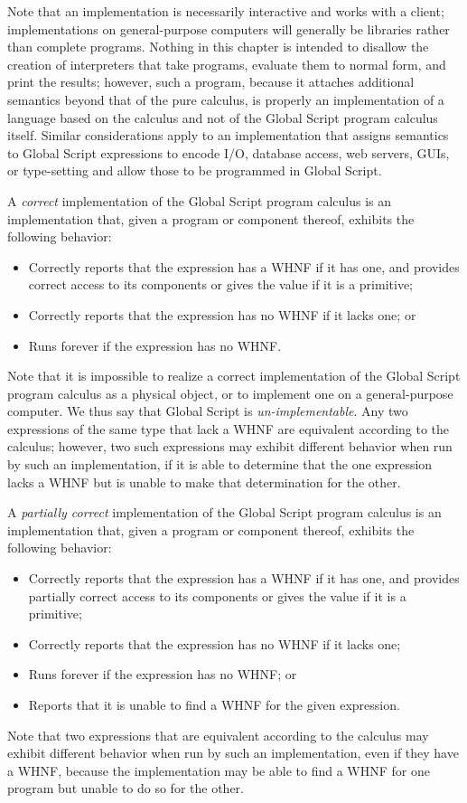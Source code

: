 \documentclass{report}
\newcommand\defn[1]{\emph{#1}}
\begin{document}
Note that an implementation is necessarily interactive and works with a client;
implementations on general-purpose computers will generally be libraries rather than complete programs.
Nothing in this chapter is intended to disallow the creation of interpreters that take programs, evaluate them to normal form, and print the results;
however, such a program, because it attaches additional semantics beyond that of the pure calculus,
is properly an implementation of a language based on the calculus and not of the Global Script program calculus itself.
Similar considerations apply to an implementation that assigns semantics to Global Script expressions to encode
I/O, database access, web servers, GUIs, or type-setting
and allow those to be programmed in Global Script.

A \defn{correct} implementation of the Global Script program calculus is an implementation that, given a program or component thereof,
exhibits the following behavior:
\begin{itemize}
  \item Correctly reports that the expression has a WHNF if it has one, and provides correct access to its components or gives the value if it is a primitive;
  \item Correctly reports that the expression has no WHNF if it lacks one; or
  \item Runs forever if the expression has no WHNF.
\end{itemize}
Note that it is impossible to realize a correct implementation of the Global Script program calculus as a physical object,
or to implement one on a general-purpose computer.
We thus say that Global Script is \defn{un-implementable}.
Any two expressions of the same type that lack a WHNF are equivalent according to the calculus;
however, two such expressions may exhibit different behavior when run by such an implementation,
if it is able to determine that the one expression lacks a WHNF but is unable to make that determination for the other.

A \defn{partially correct} implementation of the Global Script program calculus is an implementation that, given a program or component thereof,
exhibits the following behavior:
\begin{itemize}
  \item Correctly reports that the expression has a WHNF if it has one, and provides partially correct access to its components or gives the value if it is a primitive;
  \item Correctly reports that the expression has no WHNF if it lacks one;
  \item Runs forever if the expression has no WHNF; or
  \item Reports that it is unable to find a WHNF for the given expression.
\end{itemize}
Note that two expressions that are equivalent according to the calculus may exhibit different behavior when run by such an implementation,
even if they have a WHNF,
because the implementation may be able to find a WHNF for one program but unable to do so for the other.
\end{document}
